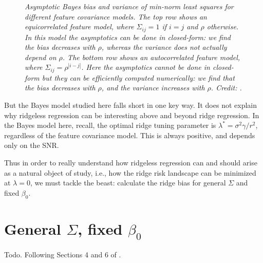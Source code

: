 \documentclass{article}
\begin{document}
\begin{figure}[p]
\caption{\it Asymptotic Bayes bias and variance of min-norm least squares for
  different feature covariance models. The top row shows an equicorrelated
  feature model, where $\Sigma_{ij} = 1$ if $i=j$ and $\rho$ otherwise. In this 
  model the asymptotics can be done in closed-form: we find the bias decreases
  with $\rho$, whereas the variance does not actually depend on $\rho$. The
  bottom row shows an autocorrelated feature model, where $\Sigma_{ij} = 
  \rho^{|i-j|}$. Here the asymptotics cannot be done in closed-form but they can  
  be efficiently computed numerically: we find that the bias decreases with
  $\rho$, and the variance increases with $\rho$. Credit:
  \citet{hastie2022surprises}.}      
\label{fig:risk_ec_ar}
\end{figure}

But the Bayes model studied here falls short in one key way. It does not explain
why ridgeless regression can be interesting above and beyond ridge
regression. In the Bayes model here, recall, the optimal ridge tuning parameter 
is $\lambda^* = \sigma^2 \gamma / r^2$, regardless of the feature covariance
model. This is always positive, and depends only on the SNR.  

Thus in order to really understand how ridgeless regression can and should
arise as a natural object of study, i.e., how the ridge risk landscape can be
minimized at $\lambda = 0$, we must tackle the beast: calculate the ridge bias
for general $\Sigma$ and fixed $\beta_0$.   

\section{General $\Sigma$, fixed $\beta_0$}

Todo. Following Sections 4 and 6 of \citet{hastie2022surprises}.



\end{document}
